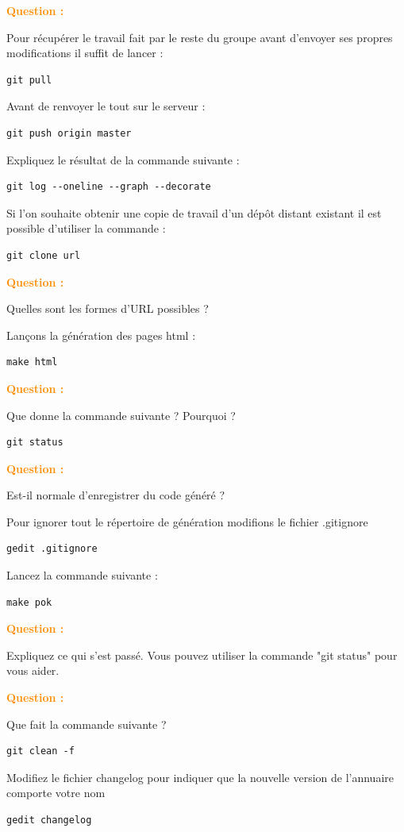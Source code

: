 \documentclass[a4paper]{article}
\newcounter{question}
\newcommand{\q}{
  \textcolor{DarkOrange}{\textbf{Question \thequestion : }}
  \addtocounter{question}{1}
  \newline
}
\begin{document}
\q Pour récupérer le travail fait par le reste du groupe avant d'envoyer ses propres modifications il suffit de lancer : 

\begin{verbatim}
git pull 
\end{verbatim}

Avant de renvoyer le tout sur le serveur :
\begin{verbatim}
git push origin master
\end{verbatim}

Expliquez le résultat de la commande suivante : 
\begin{verbatim}
git log --oneline --graph --decorate
\end{verbatim}

Si l'on souhaite obtenir une copie de travail d'un dépôt distant existant il est possible d'utiliser la commande :
\begin{verbatim}
git clone url
\end{verbatim}

\q Quelles sont les formes d'URL possibles ?

Lançons la génération des pages html : 
\begin{verbatim}
make html
\end{verbatim}

\q Que donne la commande suivante ? Pourquoi ? 
\begin{verbatim}
git status
\end{verbatim}

\q Est-il normale d'enregistrer du code généré ? 

Pour ignorer tout le répertoire de génération modifions le fichier .gitignore
\begin{verbatim}
gedit .gitignore
\end{verbatim}

Lancez la commande suivante :
\begin{verbatim}
make pok
\end{verbatim}
\q Expliquez ce qui s'est passé. Vous pouvez utiliser la commande "git status" pour vous aider.

\q Que fait la commande suivante ?
\begin{verbatim}
git clean -f
\end{verbatim}

Modifiez le fichier changelog pour indiquer que la nouvelle version de l'annuaire comporte votre nom
\begin{verbatim}
gedit changelog
\end{verbatim}
\end{document}
